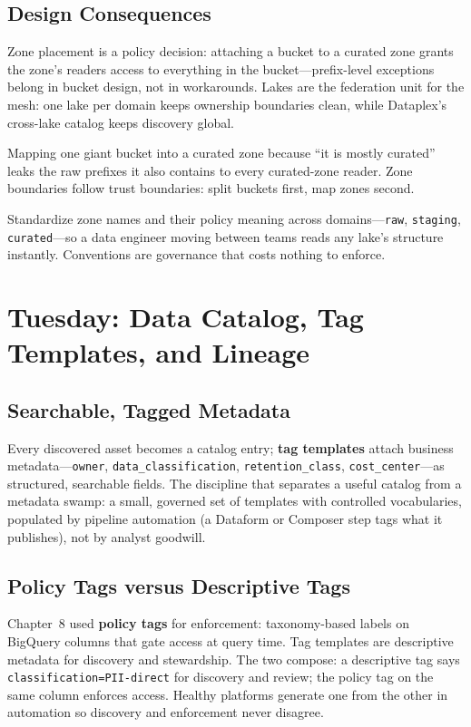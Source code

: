 \subsection{Design Consequences}
Zone placement is a policy decision: attaching a bucket to a curated zone grants the zone's readers access to everything in the bucket---prefix-level exceptions belong in bucket design, not in workarounds. Lakes are the federation unit for the mesh: one lake per domain keeps ownership boundaries clean, while Dataplex's cross-lake catalog keeps discovery global.

\begin{pitfall}
Mapping one giant bucket into a curated zone because ``it is mostly curated'' leaks the raw prefixes it also contains to every curated-zone reader. Zone boundaries follow trust boundaries: split buckets first, map zones second.
\end{pitfall}

\begin{tipbox}
Standardize zone names and their policy meaning across domains---\texttt{raw}, \texttt{staging}, \texttt{curated}---so a data engineer moving between teams reads any lake's structure instantly. Conventions are governance that costs nothing to enforce.
\end{tipbox}

\section{Tuesday: Data Catalog, Tag Templates, and Lineage}

\subsection{Searchable, Tagged Metadata}
Every discovered asset becomes a catalog entry; \textbf{tag templates} attach business metadata---\texttt{owner}, \texttt{data\_classification}, \texttt{retention\_class}, \texttt{cost\_center}---as structured, searchable fields. The discipline that separates a useful catalog from a metadata swamp: a small, governed set of templates with controlled vocabularies, populated by pipeline automation (a Dataform or Composer step tags what it publishes), not by analyst goodwill.

\subsection{Policy Tags versus Descriptive Tags}
Chapter~8 used \textbf{policy tags} for enforcement: taxonomy-based labels on BigQuery columns that gate access at query time. Tag templates are descriptive metadata for discovery and stewardship. The two compose: a descriptive tag says \texttt{classification=PII-direct} for discovery and review; the policy tag on the same column enforces access. Healthy platforms generate one from the other in automation so discovery and enforcement never disagree.

